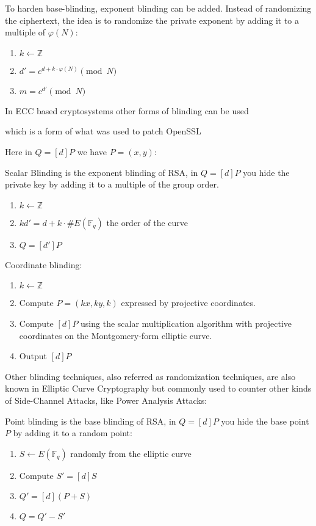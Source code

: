 \documentclass[a4paper,11pt]{article}
\begin{document}
To harden base-blinding, exponent blinding can be added. Instead of randomizing the ciphertext, the idea is to randomize the private exponent by adding it to a multiple of $\varphi(N)$:

\begin{enumerate}
    \item{$k \leftarrow \mathbb{Z}$}
    \item{$d' = c^{d + k \cdot \varphi(N)} \pmod{N}$}
    \item{$m = c^{d'} \pmod{N}$}
\end{enumerate}

In ECC based cryptosystems other forms of blinding can be used

 which is a form of what was used to patch OpenSSL
 
 Here in $Q = [d]P$ we have $P=(x,y)$:

Scalar Blinding is the exponent blinding of RSA, in $Q = [d]P$ you hide the private key by adding it to a multiple of the group order.

\begin{enumerate}
\item{$k \leftarrow \mathbb{Z}$}
\item{$k d' = d + k \cdot \#E(\mathbb{F}_q)$ the order of the curve}
\item{$Q = [d']P$}
\end{enumerate}

Coordinate blinding:

\begin{enumerate}
\item{$k \leftarrow \mathbb{Z}$}
\item{Compute $P = (kx, ky, k)$ expressed by projective coordinates.}
\item{Compute $[d]P$ using the scalar multiplication algorithm with projective coordinates on the Montgomery-form elliptic curve.}
\item{Output $[d]P$}
\end{enumerate}

Other blinding techniques, also referred as randomization techniques, are also known in Elliptic Curve Cryptography but commonly used to counter other kinds of Side-Channel Attacks, like Power Analysis Attacks:

Point blinding is the base blinding of RSA, in $Q = [d]P$ you hide the base point $P$ by adding it to a random point:

\begin{enumerate}
\item{$S \leftarrow E(\mathbb{F}_q)$ randomly from the elliptic curve}
\item{Compute $S' = [d]S$}
\item{$Q' = [d](P + S)$}
\item{$Q = Q' - S'$}
\end{enumerate}
\end{document}
